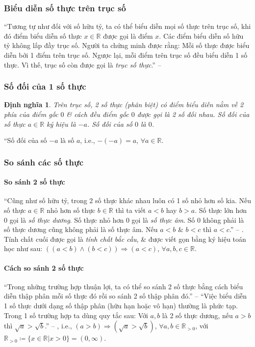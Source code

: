 \documentclass{article}
\numberwithin{equation}{section}
\newtheorem{dinhnghia}{Định nghĩa}[section]
\begin{document}
\subsubsection{Biểu diễn số thực trên trục số}
``Tương tự như đối với số hữu tỷ, ta có thể biểu diễn mọi số thực trên trục số, khi đó điểm biểu diễn số thực $x\in\mathbb{R}$ được gọi là điểm $x$. Các điểm biểu diễn số hữu tỷ không lấp đầy trục số. Người ta chứng minh được rằng: Mỗi số thực được biểu diễn bởi 1 điểm trên trục số. Ngược lại, mỗi điểm trên trục số đều biểu diễn 1 số thực. Vì thế, trục số còn được gọi là \textit{trục số thực}.'' -- \cite[p. 39]{SGK_Toan_7_Canh_Dieu_tap_1}

\subsubsection{Số đối của 1 số thực}

\begin{dinhnghia}
	Trên trục số, 2 số thực (phân biệt) có điểm biểu diễn nằm về 2 phía của điểm gốc $0$ \& cách đều điểm gốc $0$ được gọi là \emph{2 số đối nhau}. \emph{Số đối} của số thực $a\in\mathbb{R}$ ký hiệu là $-a$. Số đối của số $0$ là $0$.
\end{dinhnghia}
``Số đối của số $-a$ là số $a$, i.e., $-(-a) = a$, $\forall a\in\mathbb{R}$.

\subsubsection{So sánh các số thực}

\paragraph{So sánh 2 số thực}
``Cũng như số hữu tỷ, trong 2 số thực khác nhau luôn có 1 số nhỏ hơn số kia. Nếu số thực $a\in\mathbb{R}$ nhỏ hơn số thực $b\in\mathbb{R}$ thì ta viết $a < b$ hay $b > a$. Số thực lớn hơn $0$ gọi là \textit{số thực dương}. Số thực nhỏ hơn $0$ gọi là \textit{số thực âm}. Số $0$ không phải là số thực dương cũng không phải là số thực âm. Nếu $a < b$ \& $b < c$ thì $a < c$.'' -- \cite[p. 40]{SGK_Toan_7_Canh_Dieu_tap_1}. Tính chất cuối được gọi là \textit{tính chất bắc cầu}, \& được viết gọn bằng ký hiệu toán học như sau: $((a < b)\land(b < c))\Rightarrow(a < c)$, $\forall a,b,c\in\mathbb{R}$.

\paragraph{Cách so sánh 2 số thực}
``Trong những trường hợp thuận lợi, ta có thể so sánh 2 số thực bằng cách biểu diễn thập phân mỗi số thực đó rồi so sánh 2 số thập phân đó.'' -- \cite[p. 40]{SGK_Toan_7_Canh_Dieu_tap_1} ``Việc biểu diễn 1 số thực dưới dạng số thập phân (hữu hạn hoặc vô hạn) thường là phức tạp. Trong 1 số trường hợp ta dùng quy tắc sau: Với $a,b$ là 2 số thực dương, nếu $a > b$ thì $\sqrt{a} > \sqrt{b}$.'' -- \cite[p. 41]{SGK_Toan_7_Canh_Dieu_tap_1}, i.e., $(a > b)\Rightarrow(\sqrt{a} > \sqrt{b})$, $\forall a,b\in\mathbb{R}_{> 0}$, với $\mathbb{R}_{> 0}\coloneqq\{x\in\mathbb{R}|x > 0\} = (0,\infty)$.
\end{document}
